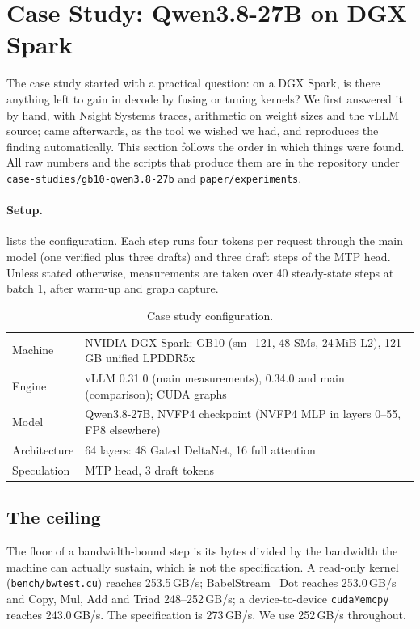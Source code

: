 \section{Case Study: Qwen3.8-27B on DGX Spark}\label{sec:case}

The case study started with a practical question: on a DGX Spark, is there anything left to gain
in decode by fusing or tuning kernels? We first answered it by hand, with Nsight Systems traces,
arithmetic on weight sizes and the vLLM source; \sys{} came afterwards, as the tool we wished we
had, and reproduces the finding automatically. This section follows the order in which things
were found. All raw numbers and the scripts that produce them are in the repository under
\texttt{case-studies/gb10-qwen3.8-27b} and \texttt{paper/experiments}.

\paragraph{Setup.}
 lists the configuration. Each step runs four tokens per request through the main
model (one verified plus three drafts) and three draft steps of the MTP head. Unless stated
otherwise, measurements are taken over 40 steady-state steps at batch 1, after warm-up and graph
capture.

\begin{table}[t]
\centering\small
\begin{tabular}{@{}ll@{}}
\toprule
Machine & NVIDIA DGX Spark: GB10 (sm\_121, 48 SMs, 24\,MiB L2), 121\,GB unified LPDDR5x \\
Engine & vLLM 0.31.0 (main measurements), 0.34.0 and main (comparison); CUDA graphs \\
Model & Qwen3.8-27B, NVFP4 checkpoint (NVFP4 MLP in layers 0--55, FP8 elsewhere) \\
Architecture & 64 layers: 48 Gated DeltaNet, 16 full attention \\
Speculation & MTP head, 3 draft tokens \\
\bottomrule
\end{tabular}
\caption{Case study configuration.}\label{tab:setup}
\end{table}

\subsection{The ceiling}

The floor of a bandwidth-bound step is its bytes divided by the bandwidth the machine can
actually sustain, which is not the specification. A read-only kernel (\texttt{bench/bwtest.cu})
reaches 253.5\,GB/s; BabelStream~\cite{deakin2016babelstream} Dot reaches 253.0\,GB/s and Copy,
Mul, Add and Triad 248--252\,GB/s; a device-to-device \texttt{cudaMemcpy} reaches 243.0\,GB/s.
The specification is 273\,GB/s. We use 252\,GB/s throughout.

